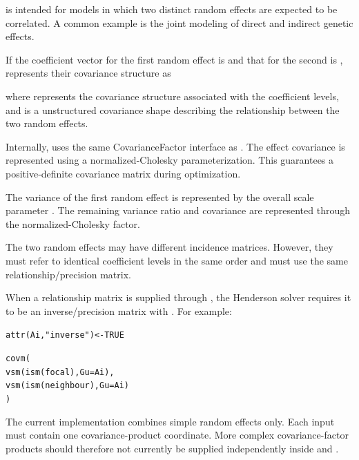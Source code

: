 \documentclass[a4paper]{book}
\begin{document}
\begin{Details}\relax

 is intended for models in which two distinct random effects
are expected to be correlated. A common example is the joint modeling
of direct and indirect genetic effects.

If the coefficient vector for the first random effect is  and
that for the second is ,  represents their covariance
structure as


where  represents the covariance structure associated with the
coefficient levels, and  is a
 unstructured covariance shape describing the
relationship between the two random effects.

Internally,  uses the same CovarianceFactor interface as
. The  effect covariance is represented
using a normalized-Cholesky parameterization. This guarantees a
positive-definite covariance matrix during optimization.

The variance of the first random effect is represented by the overall
scale parameter . The remaining variance ratio and
covariance are represented through the normalized-Cholesky factor.

The two random effects may have different incidence matrices. However,
they must refer to identical coefficient levels in the same order and
must use the same relationship/precision matrix.

When a relationship matrix is supplied through , the
Henderson solver requires it to be an inverse/precision matrix with
. For example:

\begin{alltt}
attr(Ai, "inverse") <- TRUE

covm(
vsm(ism(focal), Gu = Ai),
vsm(ism(neighbour), Gu = Ai)
)
\end{alltt}


The current implementation combines simple  random effects
only. Each input must contain one covariance-product coordinate. More
complex covariance-factor products should therefore not currently be
supplied independently inside  and .
\end{Details}
%
\end{document}
